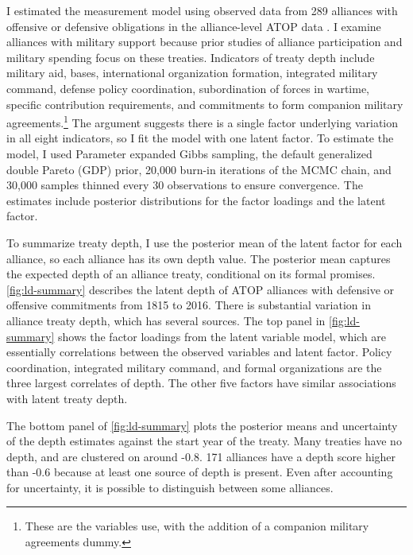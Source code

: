 \documentclass[12pt]{article}
\begin{document}
I estimated the measurement model using observed data from 289 alliances with offensive or defensive obligations in the alliance-level ATOP data \citep{Leedsetal2002}. 
I examine alliances with military support because prior studies of alliance participation and military spending focus on these treaties.
Indicators of treaty depth include military aid, bases, international organization formation, integrated military command, defense policy coordination, subordination of forces in wartime, specific contribution requirements, and commitments to form companion military agreements.\footnote{These are the variables \citet{LeedsAnac2005} use, with the addition of a companion military agreements dummy.}
The argument suggests there is a single factor underlying variation in all eight indicators, so I fit the model with one latent factor. 
To estimate the model, I used Parameter expanded Gibbs sampling, the default generalized double Pareto (GDP) prior, 20,000 burn-in iterations of the MCMC chain, and 30,000 samples thinned every 30 observations to ensure convergence. 
The estimates include posterior distributions for the factor loadings and the latent factor. 


To summarize treaty depth, I use the posterior mean of the latent factor for each alliance, so each alliance has its own depth value.
The posterior mean captures the expected depth of an alliance treaty, conditional on its formal promises. 
\autoref{fig:ld-summary} describes the latent depth of ATOP alliances with defensive or offensive commitments from 1815 to 2016.
There is substantial variation in alliance treaty depth, which has several sources. 
The top panel in \autoref{fig:ld-summary} shows the factor loadings from the latent variable model, which are essentially correlations between the observed variables and latent factor. 
Policy coordination, integrated military command, and formal organizations are the three largest correlates of depth. 
The other five factors have similar associations with latent treaty depth. 


The bottom panel of \autoref{fig:ld-summary} plots the posterior means and uncertainty of the depth estimates against the start year of the treaty. 
Many treaties have no depth, and are clustered on around -0.8.  
171 alliances have a depth score higher than -0.6 because at least one source of depth is present. 
Even after accounting for uncertainty, it is possible to distinguish between some alliances. 
\end{document}
